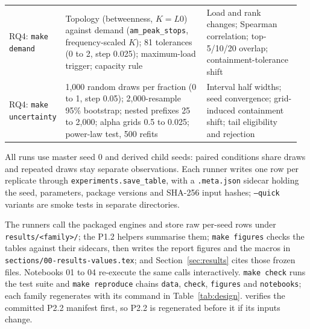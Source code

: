 \begin{table}[t]
\begin{tabular}{@{}p{0.16\linewidth} p{0.48\linewidth} p{0.32\linewidth}@{}}
    \addlinespace
    RQ4: \texttt{make demand} &
    Topology (betweenness, $K=L0$) against demand (\texttt{am\_peak\_stops},
    frequency-scaled $K$); 81 tolerances (0 to 2, step 0.025); maximum-load
    trigger; capacity rule &
    Load and rank changes; Spearman correlation; top-5/10/20 overlap;
    containment-tolerance shift \\
    \addlinespace
    RQ4: \texttt{make uncertainty} &
    1{,}000 random draws per fraction (0 to 1, step 0.05); 2{,}000-resample
    95\% bootstrap; nested prefixes 25 to 2{,}000; alpha grids 0.5 to 0.025;
    power-law test, 500 refits &
    Interval half widths; seed convergence; grid-induced containment shift;
    tail eligibility and rejection \\
    \bottomrule
  \end{tabular}
\end{table}

All runs use master seed 0 and derived child seeds: paired conditions share
draws and repeated draws stay separate observations. Each runner writes one
row per replicate through \texttt{experiments.save\_table}, with a
\texttt{.meta.json} sidecar holding the seed, parameters, package versions and
SHA-256 input hashes; \texttt{--quick} variants are smoke tests in separate
directories.

The runners call the
packaged engines and store raw per-seed rows under \texttt{results/<family>/};
the P1.2 helpers summarise them; \texttt{make figures} checks the tables
against their sidecars, then writes the report figures and the macros in
\texttt{sections/00-results-values.tex}; and Section~\ref{sec:results} cites
those frozen files. Notebooks 01 to 04 re-execute the same calls interactively.
\texttt{make check} runs the test suite and \texttt{make reproduce} chains
\texttt{data}, \texttt{check}, \texttt{figures} and \texttt{notebooks}; each
family regenerates with its command in Table~\ref{tab:design}.
 verifies the committed P2.2 manifest first, so P2.2
is regenerated before it if its inputs change.
